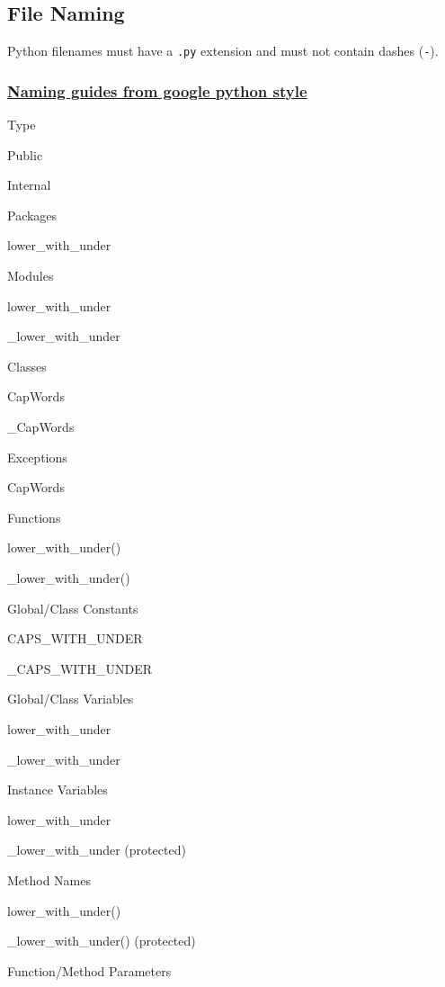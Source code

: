 \documentclass[
]{book}
\begin{document}
\hypertarget{file-naming}{%
\subsection{File Naming}\label{file-naming}}

Python filenames must have a \texttt{.py} extension and must not contain dashes (\texttt{-}).

\hypertarget{naming-guides-from-google-python-style}{%
\subsubsection{\texorpdfstring{\href{https://google.github.io/styleguide/pyguide.html\#s3.16.4-guidelines-derived-from-guidos-recommendations}{Naming guides from google python style}}{Naming guides from google python style}}\label{naming-guides-from-google-python-style}}

Type

Public

Internal

Packages

lower\_with\_under

Modules

lower\_with\_under

\_lower\_with\_under

Classes

CapWords

\_CapWords

Exceptions

CapWords

Functions

lower\_with\_under()

\_lower\_with\_under()

Global/Class Constants

CAPS\_WITH\_UNDER

\_CAPS\_WITH\_UNDER

Global/Class Variables

lower\_with\_under

\_lower\_with\_under

Instance Variables

lower\_with\_under

\_lower\_with\_under (protected)

Method Names

lower\_with\_under()

\_lower\_with\_under() (protected)

Function/Method Parameters
\end{document}
